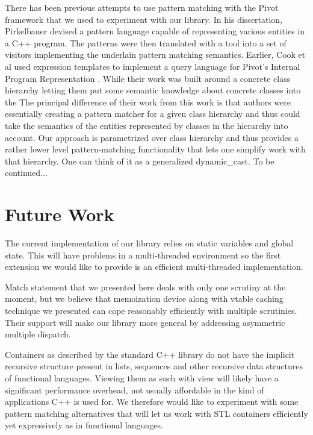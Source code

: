 \documentclass[preprint]{sigplanconf}
\begin{document}
There has been previous attempts to use pattern matching with the Pivot 
framework that we used to experiment with our library. In his dissertation, 
Pirkelbauer devised a pattern language capable of representing various entities 
in a C++ program. The patterns were then translated with a tool into a set of 
visitors implementing the underlain pattern matching 
semantics\cite{PirkelbauerThesis}. Earlier, Cook et al used expression templates 
to implement a query language for Pivot's Internal Program Representation 
\cite{iql04}. While their work was built around a concrete class hierarchy 
letting them put some semantic knowledge about concrete classes into the 
The principal difference of their work from this work is that 
authors were essentially creating a pattern matcher for a given class hierarchy 
and thus could take the semantics of the entities represented by classes in the 
hierarchy into account. Our approach is parametrized over class hierarchy and 
thus provides a rather lower level pattern-matching functionality that lets one 
simplify work with that hierarchy.  One can think of it as a generalized 
dynamic\_cast. To be continued...

\section{Future Work} %
\label{sec:fw}

The current implementation of our library relies on static variables and global 
state. This will have problems in a multi-threaded environment so the first 
extension we would like to provide is an efficient multi-threaded 
implementation.

Match statement that we presented here deals with only one scrutiny at the 
moment, but we believe that memoization device along with vtable caching 
technique we presented can cope reasonably efficiently with multiple scrutinies. 
Their support will make our library more general by addressing asymmetric 
multiple dispatch.

Containers as described by the standard C++ library do not have the implicit 
recursive structure present in lists, sequences and other recursive data 
structures of functional languages. Viewing them as such with view will likely 
have a significant performance overhead, not usually affordable in the kind of 
applications C++ is used for. We therefore would like to experiment with some 
pattern matching alternatives that will let us work with STL containers 
efficiently yet expressively as in functional languages.
\end{document}
